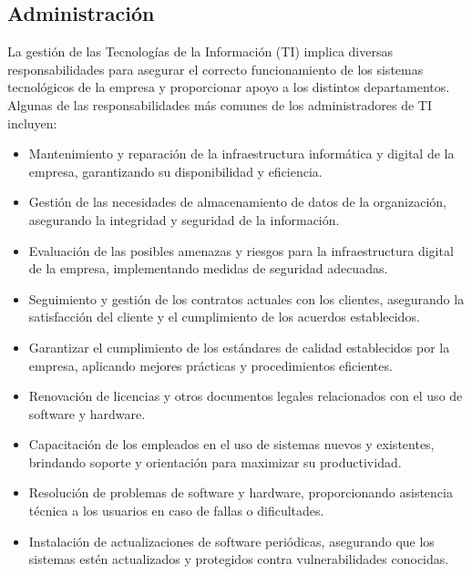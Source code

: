 \documentclass{article}
\begin{document}
\subsection{Administración}
La gestión de las Tecnologías de la Información (TI) implica diversas responsabilidades para asegurar el correcto funcionamiento de los sistemas tecnológicos de la empresa y proporcionar apoyo a los distintos departamentos. Algunas de las responsabilidades más comunes de los administradores de TI incluyen:
\begin{itemize}[label=$\circ$]
    \item Mantenimiento y reparación de la infraestructura informática y digital de la empresa, garantizando su disponibilidad y eficiencia.
    \item Gestión de las necesidades de almacenamiento de datos de la organización, asegurando la integridad y seguridad de la información.
    \item Evaluación de las posibles amenazas y riesgos para la infraestructura digital de la empresa, implementando medidas de seguridad adecuadas.
    \item Seguimiento y gestión de los contratos actuales con los clientes, asegurando la satisfacción del cliente y el cumplimiento de los acuerdos establecidos.
    \item Garantizar el cumplimiento de los estándares de calidad establecidos por la empresa, aplicando mejores prácticas y procedimientos eficientes.
    \item Renovación de licencias y otros documentos legales relacionados con el uso de software y hardware.
    \item Capacitación de los empleados en el uso de sistemas nuevos y existentes, brindando soporte y orientación para maximizar su productividad.
    \item Resolución de problemas de software y hardware, proporcionando asistencia técnica a los usuarios en caso de fallas o dificultades.
    \item Instalación de actualizaciones de software periódicas, asegurando que los sistemas estén actualizados y protegidos contra vulnerabilidades conocidas.
\end{itemize}
\end{document}

